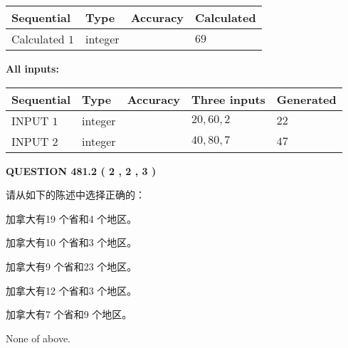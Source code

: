 \documentclass{ctexart}
\begin{document}
   
   
   
\noindent{}
   
   
  
  
\noindent\begin{tabular}{|l|l|l|l|}
\hline
 Sequential & Type & Accuracy & Calculated \\ 
\hline
 
 
  Calculated $  1 $ & integer &  & 
  $ 69 $ 
 \\  \hline  
 \end{tabular}
   
   
   
   
\noindent\vspace{0.1in}\hspace{-0.08in} {\textbf{\Large{All inputs: }}}
   
   
  
  
\noindent\begin{tabular}{|l|l|l|l|l|}
\hline
 Sequential & Type & Accuracy & Three inputs & Generated \\ 
\hline
 
 
  INPUT $  1 $ & integer &  & $
 20
 , 
 60
 , 
 2
 $ & $ 22 $ 
 \\  \hline  
 
 
  INPUT $  2 $ & integer &  & $
 40
 , 
 80
 , 
 7
 $ & $ 47 $ 
 \\  \hline  
 \end{tabular}
   
   
  
\vspace{0.2in}
  
{\textbf{\Large{QUESTION
481.2 
 ( 2 , 2 , 3 )
}}}
  
  
请从如下的陈述中选择正确的：
 
 
加拿大有19 个省和4 个地区。
 
 
加拿大有10 个省和3 个地区。
 
 
加拿大有9 个省和23 个地区。
 
 
加拿大有12 个省和3 个地区。
 
 
加拿大有7 个省和9 个地区。
 
 
 None of above.
 
 
\noindent{}
 
\end{document}
